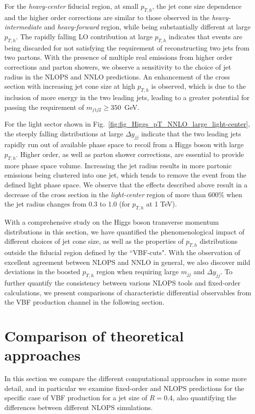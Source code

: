 \documentclass[10pt,prd,fleqn,superscriptaddress,notitlepage,nofootinbib,preprintnumbers,nobalancelastpage]{revtex4-1}
\newcommand{\VBF}{VBF\xspace}
\begin{document}
For the \textit{heavy-center} fiducial region, at small $p_{T,h}$, the jet cone size dependence and the higher order corrections are similar to those observed in the  \textit{heavy-intermediate} and \textit{heavy-forward} region, while being substantially different at large $p_{T,h}$. The rapidly falling LO contribution at large $p_{T,h}$ indicates that events are being discarded for not satisfying the requirement of reconstructing two jets from two partons.
With the presence of multiple real emissions from higher order corrections and parton showers, we observe a sensitivity to the choice of jet radius  in the NLOPS and NNLO predictions. An enhancement of the cross section with increasing jet cone size at  high $p_{T,h}$ is observed, which is due to the inclusion of more energy  in the two leading jets, leading to a greater potential for passing the requirement of $m_{j1j2} \ge 350$~GeV.

For the light sector shown in Fig.~\ref{fig:fig_Higgs_pT_NNLO_large_light-center}, the steeply falling  distributions at large $\Delta y_{jj}$  indicate that the two leading jets rapidly run out of available phase space  to recoil from a Higgs boson with large $p_{T,h}$. Higher order, as well as parton shower corrections, are essential to provide more phase space volume.
Increasing the jet radius results in more partonic emissions being clustered into one jet, which  tends to remove the event from the defined  light phase space.
We observe that the effects described above result in  a decrease of the cross section in the \textit{light-center} region  of more than 600\% when the jet radius changes from 0.3 to 1.0 (for $p_{T,h}$ at 1 TeV).

With a comprehensive study on the Higgs boson transverse momentum distributions in this section, we have quantified the phenomenological impact of different choices of jet cone size, as well as the properties of $p_{T,h}$ distributions outside the fiducial region defined by the ``VBF-cuts". With the observation of excellent agreement between NLOPS and NNLO in general, we also discover mild deviations in the boosted $p_{T,h}$ region when requiring large $m_{jj}$ and $\Delta y_{jj}$. To further quantify the consistency between various NLOPS tools and fixed-order calculations, we present comparisons of characteristic differential observables from the VBF production channel in the following section.

\section{Comparison of theoretical approaches}
\label{sec:tools}
In this section we compare the different computational approaches in some more detail, and in particular we examine
fixed-order and NLOPS predictions for the specific case of \VBF production for a jet size of $R=0.4$,
also quantifying the differences between different NLOPS simulations.
\end{document}
